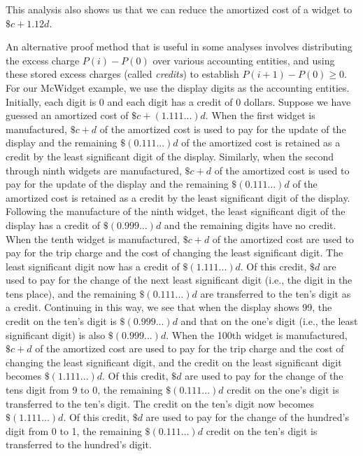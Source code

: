 This analysis also shows us that we can reduce the amortized cost of a widget
to
$\$c + 1.12d$.

An alternative proof method that is useful in some analyses involves
distributing the excess charge
$P(i) - P(0)$ over various accounting entities,
and using these stored excess charges (called {\em credits})
to establish
$P(i+1) - P(0) \geq 0$.
For our McWidget example, we use the display digits as the accounting entities.
Initially, each digit is 0 and each digit has
a credit of 0 dollars.
Suppose we have guessed an amortized cost of
$\$c + (1.111...)d$.
When the first widget is manufactured,
$\$c + d$ of the amortized cost is used to pay
for the update of the display and the remaining
$\$(0.111...)d$ of
the amortized cost is retained as a credit
by the least significant digit of the display.
Similarly, when the second through ninth widgets are manufactured,
$\$c + d$ of the amortized cost is used to pay
for the update of the display and the remaining
$\$(0.111...)d$ of the
amortized cost is retained as a credit
by the least significant digit of the display.
Following the manufacture of the ninth widget, the least
significant digit of the display has a credit of
$\$(0.999...)d$ and the remaining digits have no credit.
When the tenth widget is manufactured,
$\$c + d$ of the amortized cost are used to pay
for the trip charge and the cost of changing the least significant digit.
The least significant digit now has a credit of
$\$(1.111...)d$.  Of this credit,
$\$d$ are used to pay for the change of
the next least significant digit (i.e., the digit in the tens place),
and the remaining
$\$(0.111...)d$ are transferred to the ten's digit
as a credit.
Continuing in this way, we see that when the display shows
99, the credit on the ten's digit is
$\$(0.999...)d$ and that on the one's digit
(i.e., the least significant digit) is also
$\$(0.999...)d$. When the 100th
widget is manufactured, 
$\$c + d$ of the amortized cost are used to pay
for the trip charge and the cost of changing the least significant digit,
and the credit on the least significant digit becomes
$\$(1.111...)d$.  Of this credit,
$\$d$ are used to pay for the change of
the tens digit from 9 to 0,
the remaining
$\$(0.111...)d$ credit on the one's digit is transferred
to the ten's digit. The credit on the ten's digit now becomes
$\$(1.111...)d$.  Of this credit,
$\$d$ are used to pay for the change of
the hundred's digit from 0 to 1,
the remaining
$\$(0.111...)d$ credit on the ten's digit is transferred
to the hundred's digit.

